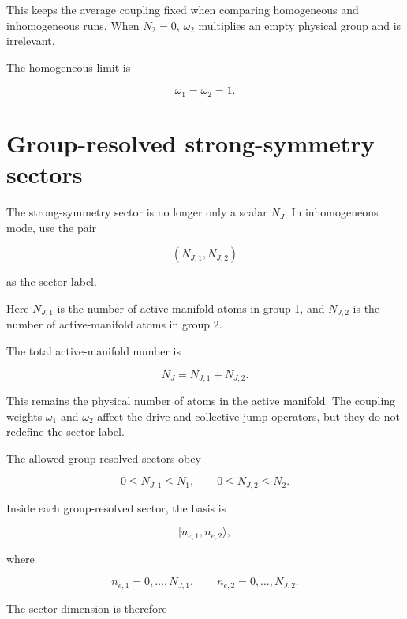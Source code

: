 \documentclass[11pt]{article}
\begin{document}
This keeps the average coupling fixed when comparing homogeneous and
inhomogeneous runs. When \(N_2=0\), \(\omega_2\) multiplies an empty physical
group and is irrelevant.

The homogeneous limit is

\begin{equation}
\omega_1=\omega_2=1.
\end{equation}

\section*{Group-resolved strong-symmetry sectors}

The strong-symmetry sector is no longer only a scalar \(N_J\). In inhomogeneous
mode, use the pair

\begin{equation}
(N_{J,1},N_{J,2})
\end{equation}

as the sector label.

Here \(N_{J,1}\) is the number of active-manifold atoms in group 1, and
\(N_{J,2}\) is the number of active-manifold atoms in group 2.

The total active-manifold number is

\begin{equation}
N_J=N_{J,1}+N_{J,2}.
\end{equation}

This remains the physical number of atoms in the active manifold. The coupling
weights \(\omega_1\) and \(\omega_2\) affect the drive and collective jump
operators, but they do not redefine the sector label.

The allowed group-resolved sectors obey

\begin{equation}
0\leq N_{J,1}\leq N_1,
\qquad
0\leq N_{J,2}\leq N_2.
\end{equation}

Inside each group-resolved sector, the basis is

\begin{equation}
|n_{e,1},n_{e,2}\rangle,
\end{equation}

where

\begin{equation}
n_{e,1}=0,\dots,N_{J,1},
\qquad
n_{e,2}=0,\dots,N_{J,2}.
\end{equation}

The sector dimension is therefore
\end{document}
